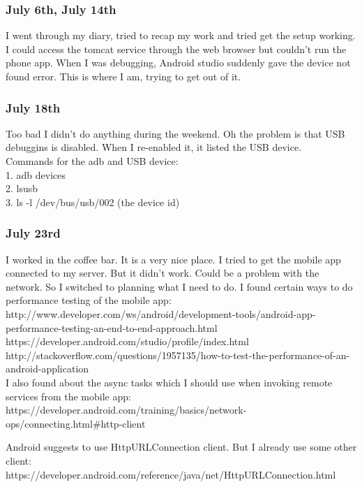 \documentclass[11pt]{article}
\begin{document}
\subsubsection*{July 6th, July 14th}
I went through my diary, tried to recap my work and tried get the setup working. I could access the tomcat service through the web browser but 
couldn't run the phone app. When I was debugging, Android studio suddenly gave the device not found error. This is where I am, trying to get out of 
it.

\subsubsection*{July 18th}
Too bad I didn't do anything during the weekend. 
Oh the problem is that USB debuggins is disabled. When I re-enabled it, it listed the USB device. \\
Commands for the adb and USB device:\\
1. adb devices\\
2. lsusb\\
3. ls -l /dev/bus/usb/002 (the device id)\\

\subsubsection*{July 23rd}
I worked in the coffee bar. It is a very nice place. I tried to get the mobile app connected to my server. But it didn't work. Could be a problem 
with the network. So I switched to planning what I need to do.
I found certain ways to do performance testing of the mobile app:\\
http://www.developer.com/ws/android/development-tools/android-app-performance-testing-an-end-to-end-approach.html\\
https://developer.android.com/studio/profile/index.html\\
http://stackoverflow.com/questions/1957135/how-to-test-the-performance-of-an-android-application\\

I also found about the async tasks which I should use when invoking remote services from the mobile app:\\
https://developer.android.com/training/basics/network-ops/connecting.html\#http-client

Android suggests to use HttpURLConnection client. But I already use some other client:
https://developer.android.com/reference/java/net/HttpURLConnection.html
\end{document}
